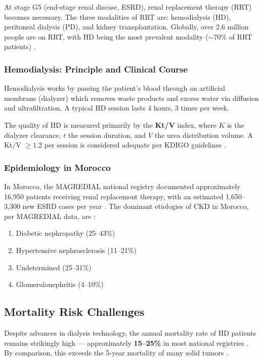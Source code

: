 \documentclass[12pt,a4paper,twoside]{report}
\begin{document}
At stage G5 (end-stage renal disease, ESRD), renal replacement therapy (RRT) becomes necessary. The three modalities of RRT are: hemodialysis (HD), peritoneal dialysis (PD), and kidney transplantation. Globally, over 2.6 million people are on RRT, with HD being the most prevalent modality ($\sim$70\% of RRT patients) \cite{usrds2022, jager2019ckd}.

\subsubsection{Hemodialysis: Principle and Clinical Course}

Hemodialysis works by passing the patient's blood through an artificial membrane (dialyzer) which removes waste products and excess water via diffusion and ultrafiltration. A typical HD session lasts 4 hours, 3 times per week.

The quality of HD is measured primarily by the \textbf{Kt/V} index, where $K$ is the dialyzer clearance, $t$ the session duration, and $V$ the urea distribution volume. A Kt/V $\geq 1.2$ per session is considered adequate per KDIGO guidelines \cite{kdigo2015}.

\subsubsection{Epidemiology in Morocco}

In Morocco, the MAGREDIAL national registry documented approximately 16,950 patients receiving renal replacement therapy, with an estimated 1,650–3,300 new ESRD cases per year \cite{maoujoud2017morocco}. The dominant etiologies of CKD in Morocco, per MAGREDIAL data, are \cite{maoujoud2017morocco}:
\begin{enumerate}
  \item Diabetic nephropathy (25--43\%)
  \item Hypertensive nephrosclerosis (11--21\%)
  \item Undetermined (25--31\%)
  \item Glomerulonephritis (4--10\%)
\end{enumerate}

\subsection{Mortality Risk Challenges}

Despite advances in dialysis technology, the annual mortality rate of HD patients remains strikingly high — approximately \textbf{15--25\%} in most national registries \cite{registre_rein_2022, kdigo2015, dopps2022}. By comparison, this exceeds the 5-year mortality of many solid tumors \cite{usrds2022}.
\end{document}
